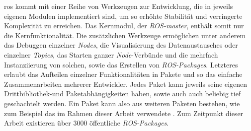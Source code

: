 \gls{ros} kommt mit einer Reihe von Werkzeugen zur Entwicklung, die in jeweils eigenen Modulen implementiert sind, um so erhöhte Stabilität und verringerte Komplexität zu erreichen. Das Kernmodul, der \textit{ROS-master}, enthält somit nur die Kernfunktionalität. Die zusätzlichen Werkzeuge ermöglichen unter anderem das Debuggen einzelner \textit{Nodes}, die Visualisierung des Datenaustausches oder einzelner \textit{Topics}, das Starten ganzer \textit{Node}-Verbünde und die mehrfach Instanziierung von solchen, sowie das Erstellen von \textit{ROS-Packages}. Letzteres erlaubt das Aufteilen einzelner Funktionalitäten in Pakete und so das einfache Zusammenarbeiten mehrerer Entwickler. Jedes Paket kann jeweils seine eigenen Drittbibliothek-und Paketabhängigkeiten haben, sowie auch auch beliebig tief geschachtelt werden. Ein Paket kann also aus weiteren Paketen bestehen, wie zum Beispiel das im Rahmen dieser Arbeit verwendete \robosherlock [Verweis]. Zum Zeitpunkt dieser Arbeit existieren über 3000 öffentliche \textit{ROS-Packages}.   


